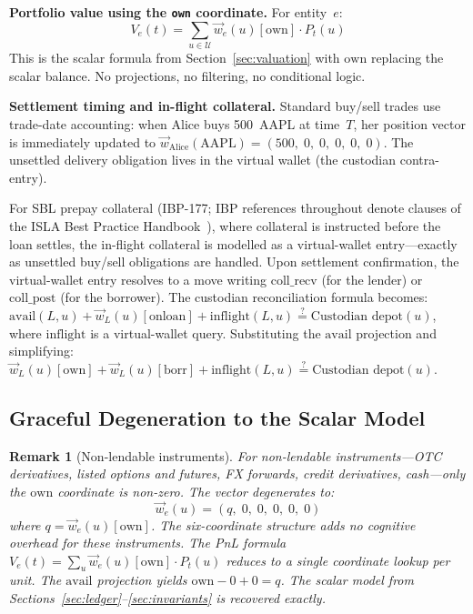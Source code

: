 \documentclass[11pt,a4paper]{article}
\newtheorem{remark}[definition]{Remark}
\begin{document}
\medskip
\noindent\textbf{Portfolio value using the \texttt{own} coordinate.} For entity~$e$:
\[
V_e(t) = \sum_{u \in \mathcal{U}} \vec{w}_e(u)[\mathrm{own}] \cdot P_t(u)
\]
This is the scalar formula from Section~\ref{sec:valuation} with $\mathrm{own}$ replacing the scalar balance. No projections, no filtering, no conditional logic.

\medskip
\noindent\textbf{Settlement timing and in-flight collateral.}
Standard buy/sell trades use trade-date accounting: when Alice buys 500~AAPL at time~$T$, her position vector is immediately updated to $\vec{w}_{\mathrm{Alice}}(\text{AAPL}) = (500,\; 0,\; 0,\; 0,\; 0,\; 0)$. The unsettled delivery obligation lives in the virtual wallet (the custodian contra-entry).

For SBL prepay collateral (IBP-177; IBP references throughout denote clauses of the ISLA Best Practice Handbook~\cite{isla-ibp}), where collateral is instructed before the loan settles, the in-flight collateral is modelled as a virtual-wallet entry---exactly as unsettled buy/sell obligations are handled. Upon settlement confirmation, the virtual-wallet entry resolves to a move writing $\mathrm{coll\_recv}$ (for the lender) or $\mathrm{coll\_post}$ (for the borrower). The custodian reconciliation formula becomes: $\mathrm{avail}(L,u) + \vec{w}_L(u)[\mathrm{onloan}] + \mathrm{inflight}(L,u) \stackrel{?}{=} \text{Custodian depot}(u)$, where $\mathrm{inflight}$ is a virtual-wallet query. Substituting the $\mathrm{avail}$ projection and simplifying: $\vec{w}_L(u)[\mathrm{own}] + \vec{w}_L(u)[\mathrm{borr}] + \mathrm{inflight}(L,u) \stackrel{?}{=} \text{Custodian depot}(u)$.

\subsection{Graceful Degeneration to the Scalar Model}
\label{sec:degeneration}

\begin{remark}[Non-lendable instruments]
For non-lendable instruments---OTC derivatives, listed options and futures, FX forwards, credit derivatives, cash---only the $\mathrm{own}$ coordinate is non-zero. The vector degenerates to:
\[
\vec{w}_e(u) = (q,\; 0,\; 0,\; 0,\; 0,\; 0)
\]
where $q = \vec{w}_e(u)[\mathrm{own}]$. The six-coordinate structure adds no cognitive overhead for these instruments. The PnL formula $V_e(t) = \sum_u \vec{w}_e(u)[\mathrm{own}] \cdot P_t(u)$ reduces to a single coordinate lookup per unit. The $\mathrm{avail}$ projection yields $\mathrm{own} - 0 + 0 = q$. The scalar model from Sections~\ref{sec:ledger}--\ref{sec:invariants} is recovered exactly.
\end{remark}
\end{document}
